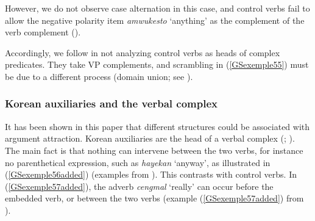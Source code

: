 {However, we do not observe case alternation in this case, and control verbs fail to allow the negative polarity item \emph{amwukesto} `anything' as the complement of the verb complement (\citealt[91]{Kim2016a-u}).

\eal
	\label{GSexemple55added} 
	\label{GSexemple55addeda}
	
	\label{GSexemple55addedb}
\zl

Accordingly, we follow \cite{Kim2016a-u} in not analyzing control verbs as heads of complex predicates. They take VP complements, and scrambling in (\ref{GSexemple55}) must be due to a different process (domain union; see \citealt{Reape94a}).


\subsubsection{Korean auxiliaries and the verbal complex}\label{GSsection4.2.2}

It has been shown in this paper that different structures could be associated with argument attraction. Korean auxiliaries are the head of a verbal complex (\citealt{Chung98a-u}; \citealt{Kim2016a-u}). The main fact is that nothing can intervene between the two verbs, for instance no parenthetical expression, such as \emph{hayekan} `anyway', as illustrated in (\ref{GSexemple56added}) (examples from \citealt[162]{Chung98a-u}). This contrasts with control verbs. In (\ref{GSexemple57added}), the adverb \emph{cengmal} `really' can occur before the embedded verb, or between the two verbs (example (\ref{GSexemple57added}) from \citealt[93]{Kim2016a-u}).


\eal
	\label{GSexemple56added} 
	\label{GSexemple56added-a}

}
